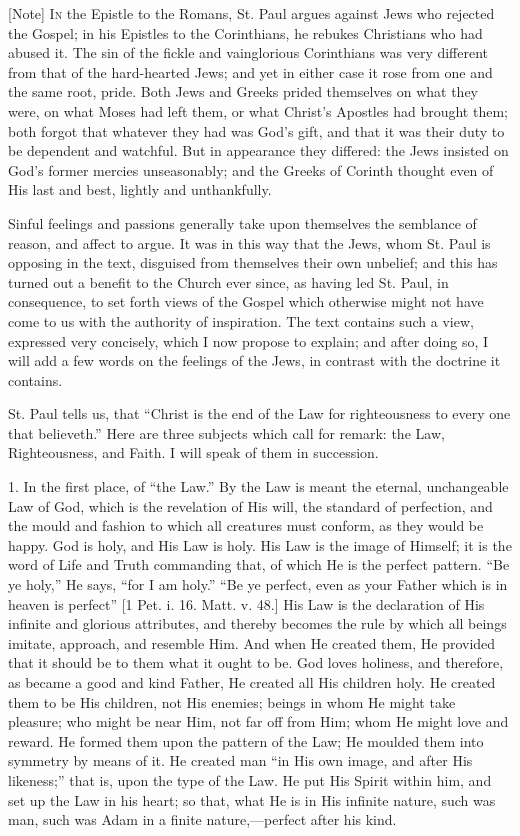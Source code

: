 [Note] I\textsc{n} the Epistle to the
Romans, St. Paul argues against Jews who rejected the Gospel; in his
Epistles to the Corinthians, he rebukes Christians who had abused it.
The sin of the fickle and vainglorious Corinthians was very different
from that of the hard-hearted Jews; and yet in either case it rose
from one and the same root, pride. Both Jews and Greeks prided
themselves on what they were, on what Moses had left them, or what
Christ's Apostles had brought them; both forgot that whatever they had
was God's gift, and that it was their duty to be dependent and
watchful. But in appearance they differed: the Jews insisted on God's
former mercies unseasonably; and the Greeks of Corinth thought even of
His last and best, lightly and unthankfully.

Sinful feelings and passions generally take upon themselves the
semblance of reason, and affect to argue. It was in this way that the
Jews, whom St. Paul is opposing in the text, disguised from themselves
their own unbelief; and this has turned out a benefit to the Church
ever since, as having led St. Paul, in consequence, to set forth views
of the Gospel which otherwise might not have come to us with the
authority of inspiration. The text contains such a view, expressed
very concisely, which I now propose to explain; and after doing so, I
will add a few words on the feelings of the Jews, in contrast with the
doctrine it contains.

St. Paul tells us, that ``Christ is the end of the Law for
righteousness to every one that believeth.'' Here are three
subjects which call for remark: the Law, Righteousness, and Faith. I
will speak of them in succession.

1. In the first place, of ``the Law.'' By the Law is meant
the eternal, unchangeable Law of God, which is the revelation of His
will, the standard of perfection, and the mould and fashion to which
all creatures must conform, as they would be happy. God is holy, and
His Law is holy. His Law is the image of Himself; it is the word of
Life and Truth commanding that, of which He is the perfect pattern.
``Be ye holy,'' He says, ``for I am holy.'' ``Be
ye perfect, even as your Father which is in heaven is perfect'' [1
Pet. i. 16. Matt. v. 48.] His Law is the declaration of His infinite
and glorious attributes, and thereby becomes the rule by which all
beings imitate, approach, and resemble Him. And when He created them,
He provided that it should be to them what it ought to be. God loves
holiness, and therefore, as became a good and kind Father, He created
all His children holy. He created them to be His children, not His
enemies; beings in whom He might take pleasure; who might be near Him,
not far off from Him; whom He might love and reward. He formed them
upon the pattern of the Law; He moulded them into symmetry by means of
it. He created man ``in His own image, and after His
likeness;'' that is, upon the type of the Law. He put His Spirit
within him, and set up the Law in his heart; so that, what He is in
His infinite nature, such was man, such was Adam in a finite nature,—perfect
after his kind.

